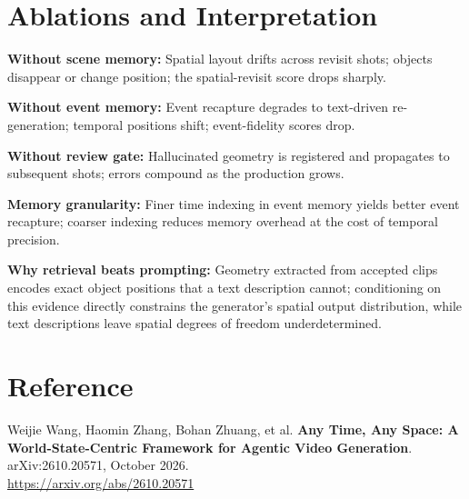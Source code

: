 \documentclass[10pt,twocolumn]{article}
\begin{document}
\section{Ablations and Interpretation}

\textbf{Without scene memory:} Spatial layout drifts across revisit shots;
objects disappear or change position; the spatial-revisit score drops sharply.

\textbf{Without event memory:} Event recapture degrades to text-driven
re-generation; temporal positions shift; event-fidelity scores drop.

\textbf{Without review gate:} Hallucinated geometry is registered and
propagates to subsequent shots; errors compound as the production grows.

\textbf{Memory granularity:} Finer time indexing in event memory yields better
event recapture; coarser indexing reduces memory overhead at the cost of
temporal precision.

\textbf{Why retrieval beats prompting:} Geometry extracted from accepted clips
encodes exact object positions that a text description cannot; conditioning on
this evidence directly constrains the generator's spatial output distribution,
while text descriptions leave spatial degrees of freedom underdetermined.

\section*{Reference}

Weijie Wang, Haomin Zhang, Bohan Zhuang, et al.
\textbf{Any Time, Any Space: A World-State-Centric Framework for Agentic Video
Generation}.
arXiv:2610.20571, October 2026.\\
\url{https://arxiv.org/abs/2610.20571}
\end{document}
